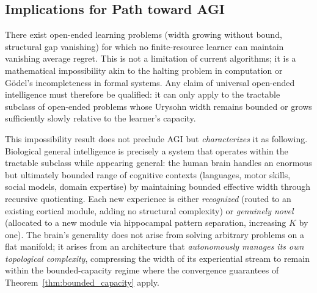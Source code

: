 \documentclass{article}
\begin{document}
\subsection{Implications for Path toward AGI}
There exist open-ended learning problems (width growing without bound, structural gap vanishing) for which no finite-resource learner can maintain vanishing average regret.
This is not a limitation of current algorithms; it is a mathematical impossibility akin to the halting problem in computation or G\"{o}del's incompleteness in formal systems.
Any claim of universal open-ended intelligence must therefore be qualified: it can only apply to the tractable subclass of open-ended problems whose Urysohn width remains bounded or grows sufficiently slowly relative to the learner's capacity.

This impossibility result does not preclude AGI but \emph{characterizes} it as following.
Biological general intelligence is precisely a system that operates within the tractable subclass while appearing general: the human brain handles an enormous but ultimately bounded range of cognitive contexts (languages, motor skills, social models, domain expertise) by maintaining bounded effective width through recursive quotienting.
Each new experience is either \emph{recognized} (routed to an existing cortical module, adding no structural complexity) or \emph{genuinely novel} (allocated to a new module via hippocampal pattern separation, increasing $K$ by one).
The brain's generality does not arise from solving arbitrary problems on a flat manifold; it arises from an architecture that \emph{autonomously manages its own topological complexity}, compressing the width of its experiential stream to remain within the bounded-capacity regime where the convergence guarantees of Theorem~\ref{thm:bounded_capacity} apply.
\end{document}
